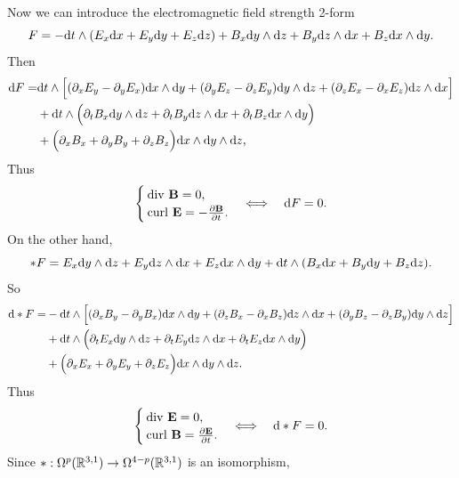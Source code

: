 Now we can introduce the electromagnetic field strength 2-form
\begin{equation*}
    F = -{\rm d} t\wedge(E_x{\rm d} x + E_y{\rm d} y + E_z{\rm d} z) + B_x{\rm d} y\wedge{\rm d} z + B_y{\rm d} z\wedge{\rm d} x + B_z{\rm d} x\wedge{\rm d} y.
\end{equation*}
Then 
\begin{align*}
    {\rm d} F =& {\rm d} t \wedge \Big[(\partial_x E_y-\partial_y E_x){\rm d} x\wedge{\rm d} y + (\partial_y E_z-\partial_z E_y){\rm d} y\wedge{\rm d} z + (\partial_z E_x-\partial_x E_z){\rm d} z\wedge{\rm d} x\Big] \\
    &+ {\rm d} t\wedge\Big(\partial_t B_x {\rm d} y \wedge {\rm d} z + \partial_t B_y {\rm d} z \wedge {\rm d} x + \partial_t B_z {\rm d} x \wedge {\rm d} y\Big) \\
    &+ \Big(\partial_xB_x+\partial_yB_y+\partial_zB_z\Big){\rm d} x\wedge{\rm d} y\wedge{\rm d} z, \\
\end{align*}
Thus 
\begin{equation*}
    \begin{cases}
        \mathrm{div}\ \mathbf{B} = 0, \\
        \mathrm{curl}\ \mathbf{E} = -\frac{\partial \mathbf{B}}{\partial t}.
    \end{cases}
    \Longleftrightarrow \quad{\rm d} F = 0.
\end{equation*}
On the other hand, 
\begin{equation*}
    \ast F = E_x{\rm d} y\wedge{\rm d} z + E_y{\rm d} z\wedge{\rm d} x + E_z{\rm d} x\wedge{\rm d} y + {\rm d} t\wedge(B_x{\rm d} x + B_y{\rm d} y + B_z{\rm d} z).
\end{equation*}
So 
\begin{align*}
    {\rm d}\ast F =& -{\rm d} t\wedge\Big[(\partial_xB_y-\partial_yB_x){\rm d} x\wedge{\rm d} y + (\partial_zB_x-\partial_xB_z){\rm d} z\wedge{\rm d} x + (\partial_yB_z-\partial_zB_y){\rm d} y\wedge{\rm d} z\Big] \\
    &+ {\rm d} t\wedge\Big(\partial_t E_x {\rm d} y \wedge {\rm d} z + \partial_t E_y {\rm d} z \wedge {\rm d} x + \partial_t E_z {\rm d} x \wedge {\rm d} y\Big) \\
    &+ \Big(\partial_x E_x + \partial_y E_y + \partial_z E_z\Big){\rm d} x\wedge{\rm d} y\wedge{\rm d} z.
\end{align*}
Thus 
\begin{equation*}
    \begin{cases}
        \mathrm{div}\ \mathbf{E} = 0, \\
        \mathrm{curl}\ \mathbf{B} = \frac{\partial \mathbf{E}}{\partial t}.
    \end{cases}
    \Longleftrightarrow \quad{\rm d}\ast F = 0.
\end{equation*}
Since $\ast:\Omega^p(\mathbb{R}^{3,1})\to\Omega^{4-p}(\mathbb{R}^{3,1})$ is an isomorphism, 
